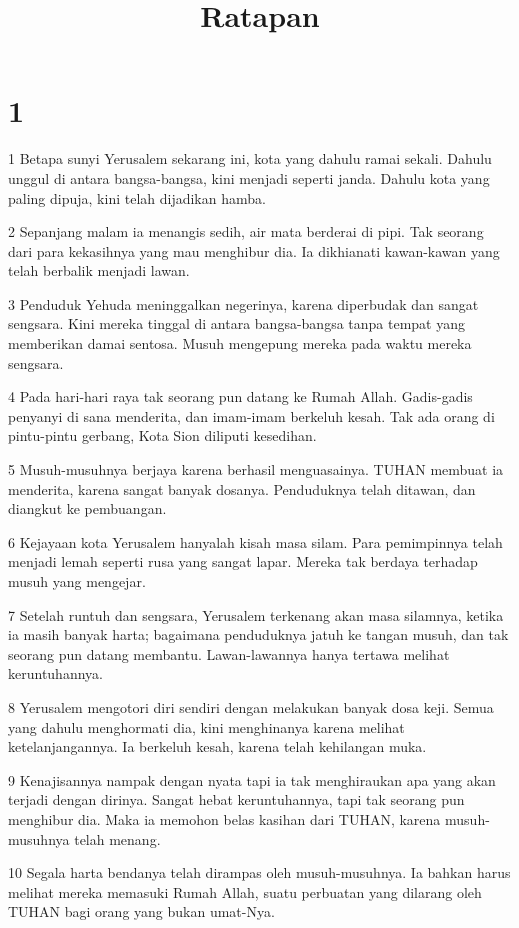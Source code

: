 

\title{Ratapan}


\chapter{1}

\par 1 Betapa sunyi Yerusalem sekarang ini, kota yang dahulu ramai sekali. Dahulu unggul di antara bangsa-bangsa, kini menjadi seperti janda. Dahulu kota yang paling dipuja, kini telah dijadikan hamba.
\par 2 Sepanjang malam ia menangis sedih, air mata berderai di pipi. Tak seorang dari para kekasihnya yang mau menghibur dia. Ia dikhianati kawan-kawan yang telah berbalik menjadi lawan.
\par 3 Penduduk Yehuda meninggalkan negerinya, karena diperbudak dan sangat sengsara. Kini mereka tinggal di antara bangsa-bangsa tanpa tempat yang memberikan damai sentosa. Musuh mengepung mereka pada waktu mereka sengsara.
\par 4 Pada hari-hari raya tak seorang pun datang ke Rumah Allah. Gadis-gadis penyanyi di sana menderita, dan imam-imam berkeluh kesah. Tak ada orang di pintu-pintu gerbang, Kota Sion diliputi kesedihan.
\par 5 Musuh-musuhnya berjaya karena berhasil menguasainya. TUHAN membuat ia menderita, karena sangat banyak dosanya. Penduduknya telah ditawan, dan diangkut ke pembuangan.
\par 6 Kejayaan kota Yerusalem hanyalah kisah masa silam. Para pemimpinnya telah menjadi lemah seperti rusa yang sangat lapar. Mereka tak berdaya terhadap musuh yang mengejar.
\par 7 Setelah runtuh dan sengsara, Yerusalem terkenang akan masa silamnya, ketika ia masih banyak harta; bagaimana penduduknya jatuh ke tangan musuh, dan tak seorang pun datang membantu. Lawan-lawannya hanya tertawa melihat keruntuhannya.
\par 8 Yerusalem mengotori diri sendiri dengan melakukan banyak dosa keji. Semua yang dahulu menghormati dia, kini menghinanya karena melihat ketelanjangannya. Ia berkeluh kesah, karena telah kehilangan muka.
\par 9 Kenajisannya nampak dengan nyata tapi ia tak menghiraukan apa yang akan terjadi dengan dirinya. Sangat hebat keruntuhannya, tapi tak seorang pun menghibur dia. Maka ia memohon belas kasihan dari TUHAN, karena musuh-musuhnya telah menang.
\par 10 Segala harta bendanya telah dirampas oleh musuh-musuhnya. Ia bahkan harus melihat mereka memasuki Rumah Allah, suatu perbuatan yang dilarang oleh TUHAN bagi orang yang bukan umat-Nya.
